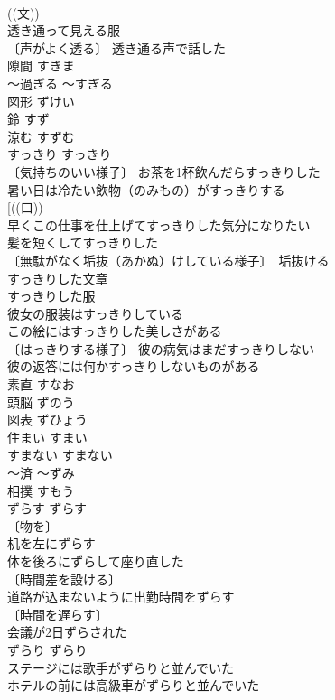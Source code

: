 \documentclass[8pt]{extreport}
\begin{document}
\begin{CJK}{UTF8}{min}
\\	((文)) 
\\	透き通って見える服 
\\	〔声がよく透る〕 透き通る声で話した 
\\	隙間	すきま	
\\	～過ぎる	～すぎる	
\\	図形	ずけい	
\\	鈴	すず	
\\	涼む	すずむ	
\\	すっきり	すっきり	
\\	〔気持ちのいい様子〕 お茶を1杯飲んだらすっきりした 
\\	暑い日は冷たい飲物（のみもの）がすっきりする 
\\	[((口)) 
\\	早くこの仕事を仕上げてすっきりした気分になりたい 
\\	髪を短くしてすっきりした 
\\	〔無駄がなく垢抜（あかぬ）けしている様子〕　垢抜ける　
\\	すっきりした文章 
\\	すっきりした服 
\\	彼女の服装はすっきりしている 
\\	この絵にはすっきりした美しさがある 
\\	〔はっきりする様子〕 彼の病気はまだすっきりしない 
\\	彼の返答には何かすっきりしないものがある 
\\	素直	すなお	
\\	頭脳	ずのう	
\\	図表	ずひょう	
\\	住まい	すまい	
\\	すまない	すまない	
\\	～済	～ずみ	
\\	相撲	すもう	
\\	ずらす	ずらす	
\\	〔物を〕
\\	机を左にずらす 
\\	体を後ろにずらして座り直した 
\\	〔時間差を設ける〕
\\	道路が込まないように出勤時間をずらす 
\\	〔時間を遅らす〕
\\	会議が2日ずらされた 
\\	ずらり	ずらり	
\\	ステージには歌手がずらりと並んでいた 
\\	ホテルの前には高級車がずらりと並んでいた 

\end{CJK}
\end{document}
